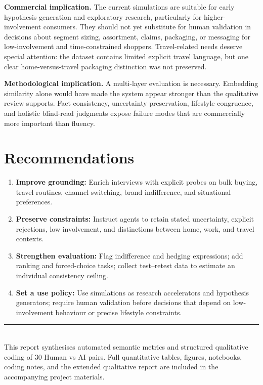 \documentclass[10pt,a4paper]{article}
\begin{document}
\textbf{Commercial implication.} The current simulations are suitable for early hypothesis generation and exploratory research, particularly for higher-involvement consumers. They should not yet substitute for human validation in decisions about segment sizing, assortment, claims, packaging, or messaging for low-involvement and time-constrained shoppers. Travel-related needs deserve special attention: the dataset contains limited explicit travel language, but one clear home-versus-travel packaging distinction was not preserved.

\textbf{Methodological implication.} A multi-layer evaluation is necessary. Embedding similarity alone would have made the system appear stronger than the qualitative review supports. Fact consistency, uncertainty preservation, lifestyle congruence, and holistic blind-read judgments expose failure modes that are commercially more important than fluency.

\section{Recommendations}

\begin{enumerate}
    \item \textbf{Improve grounding:} Enrich interviews with explicit probes on bulk buying, travel routines, channel switching, brand indifference, and situational preferences.
    \item \textbf{Preserve constraints:} Instruct agents to retain stated uncertainty, explicit rejections, low involvement, and distinctions between home, work, and travel contexts.
    \item \textbf{Strengthen evaluation:} Flag indifference and hedging expressions; add ranking and forced-choice tasks; collect test--retest data to estimate an individual consistency ceiling.
    \item \textbf{Set a use policy:} Use simulations as research accelerators and hypothesis generators; require human validation before decisions that depend on low-involvement behaviour or precise lifestyle constraints.
\end{enumerate}

{\color{primary}\rule{\textwidth}{0.6pt}}\\[-1pt]
{\scriptsize This report synthesises automated semantic metrics and structured qualitative coding of 30 Human vs AI pairs. Full quantitative tables, figures, notebooks, coding notes, and the extended qualitative report are included in the accompanying project materials.}
\end{document}
